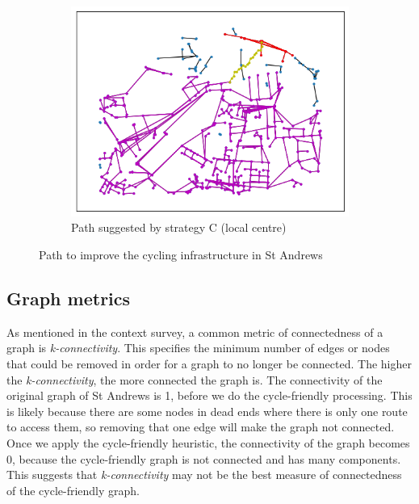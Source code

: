 \documentclass[12pt,a4paper]{report}
\begin{document}
\begin{figure}[ht]
\begin{subfigure}[ht]{0.6\textwidth}
    \end{subfigure}
    \hfill
    \begin{subfigure}[ht]{0.6\textwidth}
        \centering
        \includegraphics[width=\textwidth,trim={1cm 1cm 1cm 1cm},clip]{diss_images/eval/local_st_andrews.png}
        \caption{Path suggested by strategy C (local centre)}
        \label{fig:local st andrews}
    \end{subfigure}
       \caption{Path to improve the cycling infrastructure in St Andrews}
       \label{fig:path st andrews}
\end{figure}

\subsection{Graph metrics}
As mentioned in the context survey, a common metric of connectedness of a graph is \textit{k-connectivity}. This specifies the minimum number of edges or nodes that could be removed in order for a graph to no longer be connected. The higher the \textit{k-connectivity}, the more connected the graph is. The connectivity of the original graph of St Andrews is 1, before we do the cycle-friendly processing. This is likely because there are some nodes in dead ends where there is only one route to access them, so removing that one edge will make the graph not connected. Once we apply the cycle-friendly heuristic, the connectivity of the graph becomes 0, because the cycle-friendly graph is not connected and has many components. This suggests that \textit{k-connectivity} may not be the best measure of connectedness of the cycle-friendly graph.
\end{document}
